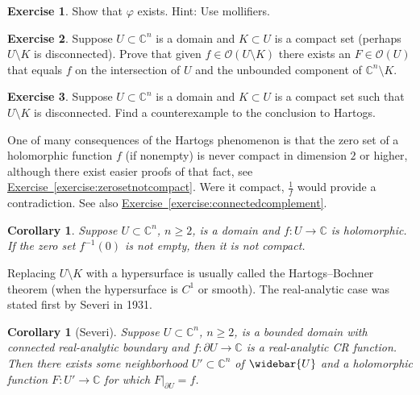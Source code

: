 \documentclass[12pt,openany]{book}
\newcommand{\C}{{\mathbb{C}}}
\newcommand{\sO}{{\mathscr{O}}}
\theoremstyle{plain}
\newtheorem{cor}[thm]{Corollary}
\theoremstyle{remark}
\theoremstyle{definition}
\newenvironment{exbox}{%
    \def\FrameCommand{\vrule width 1pt \relax\hspace{10pt}}%
    \MakeFramed{\advance\hsize-\width\FrameRestore}%
}{%
    \endMakeFramed
}
\theoremstyle{exercise}
\newtheorem{exercise}{Exercise}[section]
\theoremstyle{example}
\newcommand{\exerciseref}[1]{\hyperref[#1]{Exercise~\ref*{#1}}}
\begin{document}
\begin{exbox}
\begin{exercise}
Show that $\varphi$ exists.  Hint: Use mollifiers.
\end{exercise}

\begin{exercise}
Suppose $U \subset \C^n$ is a domain and
$K \subset U$ is a compact set (perhaps $U \setminus
K$ is disconnected).
Prove that given $f \in \sO(U \setminus K)$ there exists an $F \in \sO(U)$ that equals
$f$ on the intersection of $U$ and the unbounded component
of $\C^n \setminus K$.
\end{exercise}

\begin{exercise}
Suppose $U \subset \C^n$ is a domain and
$K \subset U$ is a compact set such that $U \setminus K$ is disconnected.
Find a counterexample to the conclusion to Hartogs.
\end{exercise}
\end{exbox}

One of many consequences of the Hartogs phenomenon is
that
the zero set of a holomorphic function $f$ (if nonempty) is never compact in
dimension $2$ or higher, although there exist
easier proofs of that fact, see \exerciseref{exercise:zerosetnotcompact}.
Were it compact, $\frac{1}{f}$ would provide a contradiction.
See also
\exerciseref{exercise:connectedcomplement}.

\begin{cor}
Suppose $U \subset \C^n$, $n \geq 2$, is a domain and $f \colon U \to \C$ is
holomorphic.  If the zero set $f^{-1}(0)$ is not empty, then it is not compact.
\end{cor}

Replacing $U \setminus K$ with a hypersurface
is usually called the Hartogs--Bochner theorem (when the hypersurface is
$C^1$ or smooth).
The real-analytic case was stated first by Severi in 1931.

\begin{cor}[Severi]
Suppose $U \subset \C^n$, $n \geq 2$, is a bounded domain with connected real-analytic boundary and
$f \colon \partial U \to \C$ is a real-analytic CR function.  Then
there exists some neighborhood $U' \subset \C^n$ of $\widebar{U}$
and a holomorphic function $F \colon U' \to \C$ for which
$F|_{\partial U} = f$.
\end{cor}
\end{document}
